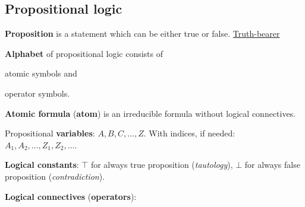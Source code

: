 \documentclass[a4paper,10pt]{article}
\begin{document}
\newpage
\subsection{Propositional logic}

\begin{terms}
    \item \textbf{Proposition} is a statement which can be either true or false.
    \hfill\href{https://en.wikipedia.org/wiki/Truth-bearer}{Truth-bearer}

    \item \textbf{Alphabet} of propositional logic consists of
    \begin{mylist}
        \item atomic symbols and
        \item operator symbols.
    \end{mylist}



    \item \textbf{Atomic formula} (\textbf{atom}) is an irreducible formula without logical connectives.
    \begin{terms}
        \item Propositional \textbf{variables}: $A, B, C, \dotsc, Z$. With indices, if needed: $A_1, A_2, \dotsc, Z_1, Z_2, \dotsc$.

        \item \textbf{Logical constants}: $\top$ for always true proposition (\textit{tautology}), $\bot$ for always false proposition (\textit{contradiction}).
    \end{terms}

    \item \textbf{Logical connectives} (\textbf{operators}):

    \begingroup
    \newcommand{\myA}{\mathcal{P}}
    \newcommand{\myB}{\mathcal{Q}}


\end{terms}
\end{document}
